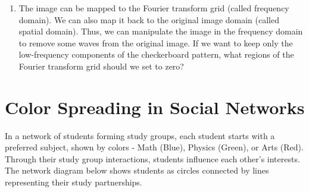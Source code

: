 \documentclass[a4paper, 12pt]{extarticle}
\begin{document}
\begin{enumerate}
\begin{center}
\end{center}

\item The image can be mapped to the Fourier transform grid (called frequency domain). We can also map it back to the original image domain (called spatial domain). Thus, we can manipulate the image in the frequency domain to remove some waves from the original image.
If we want to keep only the low-frequency components of the checkerboard pattern, what regions of the Fourier transform grid should we set to zero?

\end{enumerate}

\clearpage

\section{Color Spreading in Social Networks}
In a network of students forming study groups, each student starts with a preferred subject, shown by colors - Math (Blue), Physics (Green), or Arts (Red). Through their study group interactions, students influence each other's interests. The network diagram below shows students as circles connected by lines representing their study partnerships.
\end{document}
